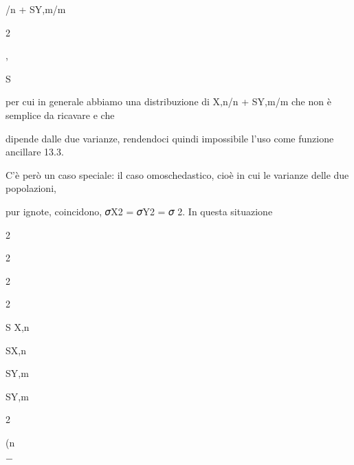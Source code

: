\documentclass[a4paper,portrait,12pt]{article}
\begin{document}
\begin{flushleft}
/n + SY,m/m
\end{flushleft}


2





,





\begin{flushleft}
S
\end{flushleft}


\begin{flushleft}
per cui in generale abbiamo una distribuzione di X,n/n + SY,m/m che non \`{e} semplice da ricavare e che
\end{flushleft}


\begin{flushleft}
dipende dalle due varianze, rendendoci quindi impossibile l'uso come funzione ancillare 13.3.
\end{flushleft}


\begin{flushleft}
C'\`{e} per\`{o} un caso speciale: il caso omoschedastico, cio\`{e} in cui le varianze delle due popolazioni,
\end{flushleft}


\begin{flushleft}
pur ignote, coincidono, 𝜎X2 = 𝜎Y2 = 𝜎 2. In questa situazione
\end{flushleft}


2


2


2


2


\begin{flushleft}
S X,n
\end{flushleft}


\begin{flushleft}
SX,n
\end{flushleft}


\begin{flushleft}
SY,m
\end{flushleft}


\begin{flushleft}
SY,m
\end{flushleft}


2


\begin{flushleft}
(n
\end{flushleft}


$-$
\end{document}
